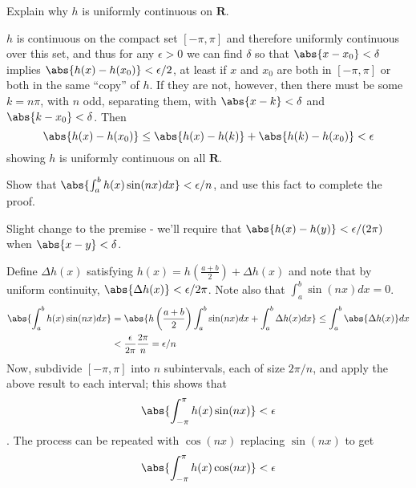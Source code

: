 \begin{exercise}
Explain why \(h\) is uniformly continuous on \(\mathbf{R}\).
\end{exercise}
\begin{solution}
\(h\) is continuous on the compact set \([-\pi, \pi]\) and therefore uniformly continuous over this set, and thus for any \(\epsilon> 0\) we can find \(\delta\) so that \(\abs{x - x_0} < \delta\) implies \(\abs{h(x) - h(x_0)} < \epsilon / 2\), at least if \(x\) and \(x_0\) are both in \([-\pi, \pi]\) or both in the same ``copy'' of \(h\). If they are not, however, then there must be some \(k = n\pi\), with \(n\) odd, separating them, with \(\abs{x - k} < \delta\) and \(
    \abs{k - x_0} < \delta\). Then
\[\abs{h(x) - h(x_0)} \leq \abs{h(x) - h(k)} + \abs{h(k) - h(x_0)} < \epsilon\]
showing \(h\) is uniformly continuous on all \(\mathbf{R}\).
\end{solution}

\begin{exercise}
Show that \(\abs{\int_a^b h(x) \sin(nx) dx} < \epsilon/n\), and use this fact to complete the proof.
\end{exercise}
\begin{solution}
Slight change to the premise - we'll require that \(\abs{h(x) - h(y)} < \epsilon / (2\pi)\) when \(\abs{x-y} < \delta\).

Define \(\Delta h(x) \) satisfying \(h(x) = h(\frac{a+b}{2}) + \Delta h(x) \) and note that by uniform continuity, \(\abs{\Delta h(x)} < \epsilon / {2\pi}\). Note also that \(\int_a^b \sin(nx) dx= 0\).
\[
    \begin{aligned}
    \abs{\int_a^b h(x) \sin(nx) dx} &= \abs{h\left(\frac{a+b}{2}\right) \int_a^b \sin(nx) dx + \int_a^b \Delta h(x) dx} \leq \int_a^b \abs{\Delta h(x)} dx \\
    &< \frac{\epsilon}{2\pi} \frac{2\pi}{n} = \epsilon/n
    \end{aligned}
\]
Now, subdivide \([-\pi, \pi]\) into \(n\) subintervals, each of size \(2\pi/n\), and apply the above result to each interval; this shows that \[\abs{\int_{-\pi}^\pi h(x) \sin(nx)} < \epsilon\]. The process can be repeated with \(\cos(nx)\) replacing \(\sin(nx)\) to get \[\abs{\int_{-\pi}^\pi h(x) \cos(nx)} < \epsilon\]
\end{solution}

